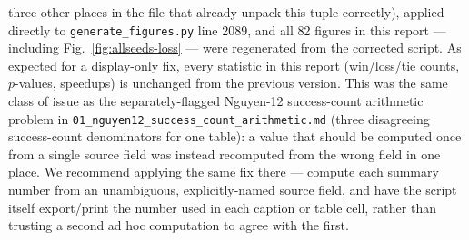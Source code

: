 \documentclass[11pt]{article}
\begin{document}
\begin{enumerate}
    three other places in the file that already unpack this tuple correctly), applied directly to
    \texttt{generate\_figures.py} line 2089, and all 82 figures in this report --- including
    Fig.~\ref{fig:allseeds-loss} --- were regenerated from the corrected script. As expected for a
    display-only fix, every statistic in this report (win/loss/tie counts, $p$-values, speedups) is
    unchanged from the previous version. This was the same class of issue as the separately-flagged
    Nguyen-12 success-count arithmetic problem in
    \texttt{01\_nguyen12\_success\_count\_arithmetic.md} (three disagreeing success-count
    denominators for one table): a value that should be computed once from a single source field
    was instead recomputed from the wrong field in one place. We recommend applying the same fix
    there --- compute each summary number from an unambiguous, explicitly-named source field, and
    have the script itself export/print the number used in each caption or table cell, rather than
    trusting a second ad hoc computation to agree with the first.
\end{enumerate}
\end{document}
